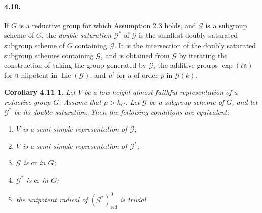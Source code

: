 \documentclass[11pt]{article}
\newcommand{\Lie}{\operatorname{Lie}}
\newcommand{\red}{\mathrm{red}}
\newtheorem*{corollary411}{Corollary 4.11}
\begin{document}
\paragraph{4.10.}
If \(G\) is a reductive group for which Assumption 2.3 holds, and \(\mathcal G\) is a
subgroup scheme of \(G\), the \emph{double saturation} \(\mathcal G^*\) of
\(\mathcal G\) is the smallest doubly saturated subgroup scheme of \(G\) containing
\(\mathcal G\). It is the intersection of the doubly saturated subgroup schemes
containing \(\mathcal G\), and is obtained from \(\mathcal G\) by iterating the
construction of taking the group generated by \(\mathcal G\), the additive groups
\(\exp(t\mathfrak n)\) for \(\mathfrak n\) nilpotent in \(\Lie(\mathcal G)\), and
\(u^t\) for \(u\) of order \(p\) in \(\mathcal G(k)\).

\begin{corollary411}
Let \(V\) be a low-height almost faithful representation of a reductive group \(G\).
Assume that \(p>h_G\). Let \(\mathcal G\) be a subgroup scheme of \(G\), and let
\(\mathcal G^*\) be its double saturation. Then the following conditions are equivalent:
\begin{enumerate}[label=(\roman*),leftmargin=2em]
\item \(V\) is a semi-simple representation of \(\mathcal G\);
\item \(V\) is a semi-simple representation of \(\mathcal G^*\);
\item \(\mathcal G\) is \(\mathrm{cr}\) in \(G\);
\item \(\mathcal G^*\) is \(\mathrm{cr}\) in \(G\);
\item the unipotent radical of \((\mathcal G^*)^0_{\red}\) is trivial.
\end{enumerate}
\end{corollary411}
\end{document}
